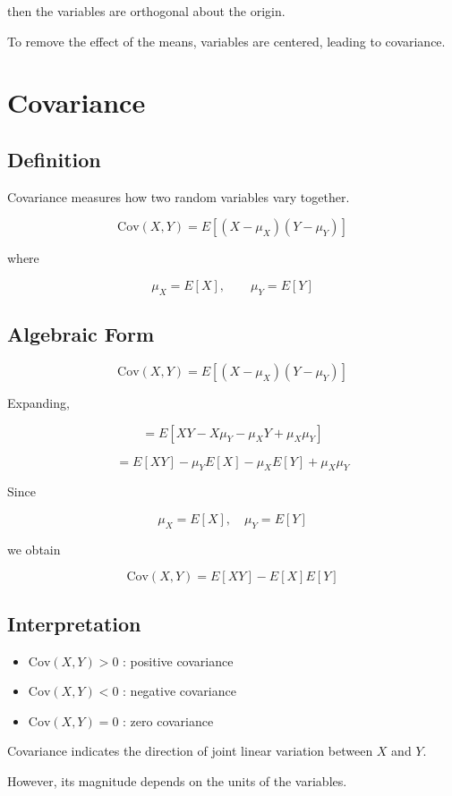 \documentclass[12pt]{article}
\begin{document}
then the variables are orthogonal about the origin.

To remove the effect of the means, variables are centered, leading to covariance.

\section{Covariance}

\subsection{Definition}

Covariance measures how two random variables vary together.

\[
\text{Cov}(X,Y) = E[(X-\mu_X)(Y-\mu_Y)]
\]

where

\[
\mu_X = E[X], \qquad \mu_Y = E[Y]
\]

\subsection{Algebraic Form}

\[
\text{Cov}(X,Y) = E[(X-\mu_X)(Y-\mu_Y)]
\]

Expanding,

\[
= E[XY - X\mu_Y - \mu_X Y + \mu_X \mu_Y]
\]

\[
= E[XY] - \mu_YE[X] - \mu_XE[Y] + \mu_X\mu_Y
\]

Since

\[
\mu_X = E[X], \quad \mu_Y = E[Y]
\]

we obtain

\[
\boxed{\text{Cov}(X,Y) = E[XY] - E[X]E[Y]}
\]

\subsection{Interpretation}

\begin{itemize}
\item $\text{Cov}(X,Y) > 0$ : positive covariance
\item $\text{Cov}(X,Y) < 0$ : negative covariance
\item $\text{Cov}(X,Y) = 0$ : zero covariance
\end{itemize}

Covariance indicates the direction of joint linear variation between $X$ and $Y$.

However, its magnitude depends on the units of the variables.
\end{document}
